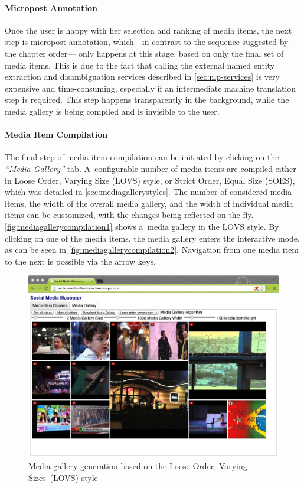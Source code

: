 \paragraph{Micropost Annotation}

Once the user is happy with her selection and ranking of media items,
the next step is micropost annotation,
which---in contrast to the sequence suggested by the chapter order---%
only happens at this stage, based on only the final set of media items.
This is due to the fact that calling the external
named entity extraction and disambiguation services described in
\autoref{sec:nlp-services} is very expensive and time-consuming,
especially if an intermediate machine translation step is required.
This step happens transparently in the background,
while the media gallery is being compiled and is invisible to the user.

\paragraph{Media Item Compilation}

The final step of media item compilation can be initiated
by clicking on the \emph{``Media Gallery''} tab.
A~configurable number of media items are compiled either in 
Loose Order, Varying Size (LOVS) style, or 
Strict Order, Equal Size (SOES), which was detailed in 
\autoref{sec:mediagallerystyles}.
The number of considered media items,
the width of the overall media gallery,
and the width of individual media items can be customized,
with the changes being reflected on-the-fly.
\autoref{fig:mediagallerycompilation1} shows a~media gallery
in the LOVS style.
By clicking on one of the media items,
the media gallery enters the interactive mode,
as can be seen in \autoref{fig:mediagallerycompilation2}.
Navigation from one media item to the next is possible via the arrow keys.

\begin{figure}[!ht]
  \centering
  \includegraphics[width=1\columnwidth]{app4.png}
  \caption[Media gallery generation based on the Loose Order, Varying Sizes style]{Media gallery generation based on the Loose Order, Varying Sizes~(LOVS) style}
  \label{fig:mediagallerycompilation1}
\end{figure}


